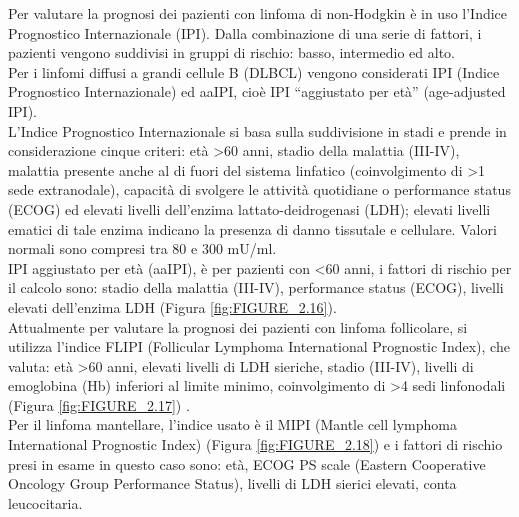 Per valutare la prognosi dei pazienti con linfoma di non-Hodgkin è in uso l’Indice Prognostico Internazionale (IPI). 
Dalla combinazione di una serie di fattori, i pazienti vengono suddivisi in gruppi di rischio: basso, intermedio 
ed alto.\\ 
Per i linfomi diffusi a grandi cellule B (DLBCL) vengono considerati IPI (Indice Prognostico Internazionale) ed aaIPI, 
cioè IPI “aggiustato per età” (age-adjusted IPI)\cite{AIOM}.\\
L’Indice Prognostico Internazionale si basa sulla suddivisione in stadi e prende in considerazione cinque criteri: 
età >60 anni, stadio della malattia (III-IV), malattia presente anche al di fuori del sistema linfatico 
(coinvolgimento di >1 sede extranodale), capacità di svolgere le attività quotidiane o performance status (ECOG)
ed elevati livelli dell’enzima lattato-deidrogenasi (LDH)\cite{AIOM}; elevati livelli ematici di tale enzima indicano la presenza di 
danno tissutale e cellulare. Valori normali sono compresi tra 80 e 300 mU/ml.\\ 
IPI aggiustato per età (aaIPI), è per pazienti con <60 anni, i fattori di rischio per il calcolo sono: 
stadio della malattia (III-IV), performance status (ECOG), livelli elevati dell’enzima LDH (Figura \ref{fig:FIGURE_2.16}).\\
Attualmente per valutare la prognosi dei pazienti con linfoma follicolare, si utilizza l’indice FLIPI 
(Follicular Lymphoma International Prognostic Index), che valuta: 
età >60 anni, elevati livelli di LDH sieriche, stadio (III-IV), livelli di emoglobina (Hb) inferiori al limite minimo, 
coinvolgimento di >4 sedi linfonodali (Figura \ref{fig:FIGURE_2.17}) \cite{AIOM}.\\
Per il linfoma mantellare, l’indice usato è il MIPI (Mantle cell lymphoma International Prognostic Index) 
(Figura \ref{fig:FIGURE_2.18}) e i fattori di rischio presi in esame in questo caso sono: età, ECOG PS scale 
(Eastern Cooperative Oncology Group Performance Status), livelli di LDH sierici elevati, conta leucocitaria\cite{MIPI}.\\

